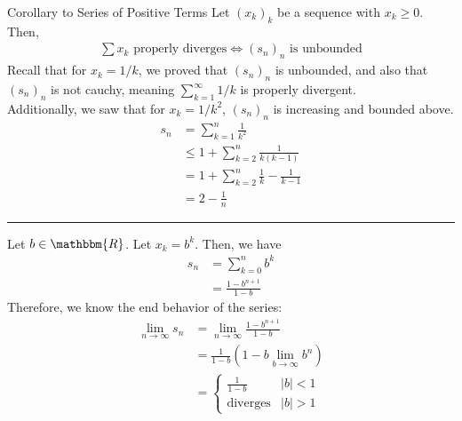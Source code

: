 \documentclass[10pt]{extarticle}
\newcommand{\R}{\mathbbm{R}}
\begin{document}
  \begin{problem}{Corollary to Series of Positive Terms}
    Let $(x_k)_k$ be a sequence with $x_k \geq 0$. Then,
    \begin{align*}
      \sum x_k \text{ properly diverges} \Leftrightarrow (s_n)_n \text{ is unbounded}
    \end{align*}
    Recall that for $x_k = 1/k$, we proved that $(s_n)_n$ is unbounded, and also that $(s_n)_n$ is not cauchy, meaning $\sum_{k=1}^{\infty}1/k$ is properly divergent.\\
    
    Additionally, we saw that for $x_k = 1/k^2$, $(s_n)_n$ is increasing and bounded above.
    \begin{align*}
      s_n &= \sum_{k=1}^{n}\frac{1}{k^2}\\
          &\leq 1 + \sum_{k=2}^{n}\frac{1}{k(k-1)}\\
          &= 1 + \sum_{k=2}^{n}\frac{1}{k} - \frac{1}{k-1}\\
          &= 2 - \frac{1}{n}
    \end{align*}
    \vspace{4pt}
    \rule{\textwidth}{0.4pt}
    \vspace{4pt}
    Let $b\in\R$. Let $x_k = b^k$. Then, we have
    \begin{align*}
      s_n &= \sum_{k=0}^{n}b^k\\
          &= \frac{1-b^{n+1}}{1-b} \tag*{$b\neq 1$}
    \end{align*}
    Therefore, we know the end behavior of the series:
    \begin{align*}
      \lim_{n\rightarrow\infty} s_n &= \lim_{n\rightarrow\infty} \frac{1-b^{n+1}}{1-b}\\
                                    &= \frac{1}{1-b} \left(1-b\lim_{b\rightarrow\infty}b^{n}\right)\\
                                    &= \begin{cases}
                                      \frac{1}{1-b} & |b| < 1\\
                                      \text{diverges} & |b| > 1
                                    \end{cases}
    \end{align*}
  \end{problem}
\end{document}
